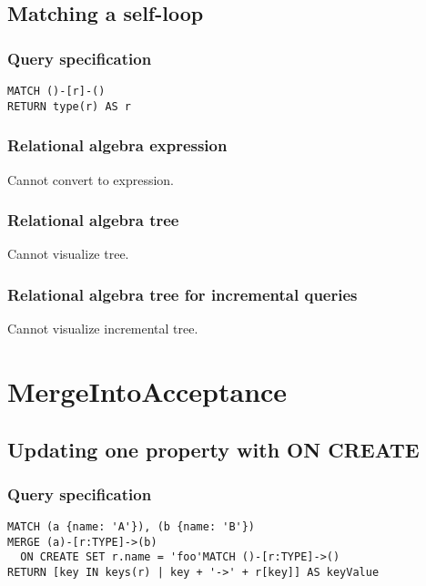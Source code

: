 \subsection{Matching a self-loop}

\subsubsection*{Query specification}

\begin{lstlisting}
MATCH ()-[r]-()
RETURN type(r) AS r
\end{lstlisting}

\subsubsection*{Relational algebra expression}

Cannot convert to expression.

\subsubsection*{Relational algebra tree}

Cannot visualize tree.

\subsubsection*{Relational algebra tree for incremental queries}

Cannot visualize incremental tree.

\section{MergeIntoAcceptance}

\subsection{Updating one property with ON CREATE}

\subsubsection*{Query specification}

\begin{lstlisting}
MATCH (a {name: 'A'}), (b {name: 'B'})
MERGE (a)-[r:TYPE]->(b)
  ON CREATE SET r.name = 'foo'MATCH ()-[r:TYPE]->()
RETURN [key IN keys(r) | key + '->' + r[key]] AS keyValue
\end{lstlisting}

